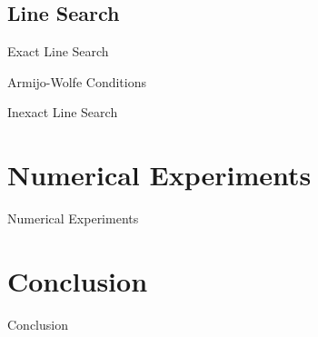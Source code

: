 \documentclass{beamer}
\begin{document}
\subsection{Line Search}
\begin{frame}{Exact Line Search}
\end{frame}

\begin{frame}{Armijo-Wolfe Conditions}
\end{frame}

\begin{frame}{Inexact Line Search}
\end{frame}

\section{Numerical Experiments}
\begin{frame}{Numerical Experiments}
\end{frame}

\section{Conclusion}
\begin{frame}{Conclusion}
\end{frame}
\end{document}
